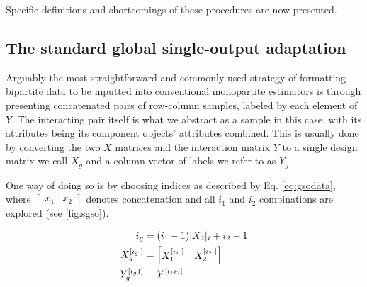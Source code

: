 Specific definitions and shortcomings of these procedures are now presented.


\subsection{The standard global single-output adaptation}
\label{sec:sgso}
Arguably the most straightforward and commonly used strategy of formatting bipartite data to be inputted into conventional monopartite estimators is through presenting concatenated pairs of row-column samples, labeled by each element of $Y$.
%
The interacting pair itself is what we abstract as a sample
in this case, with its attributes being its component objects' attributes
combined. This is usually done by converting the two $X$ matrices and the
interaction matrix $Y$ to a single design matrix we call $X_g$ and a column-vector
 of labels we refer to as $Y_g$.

One way of
doing so is by choosing indices as described by Eq. \ref{eq:gsodata}, where
$\begin{bmatrix} x_1 & x_2\end{bmatrix}$ denotes concatenation and all $i_1$ and
$i_2$ combinations are explored (see \autoref{fig:sgso}).

%
\begin{equation}
    \begin{split}
    i_g &= (i_1-1)|X_2|_i+i_2-1\\
    X_g ^{[i_g\cdot]} &= \begin{bmatrix} X_1 ^{[i_1\cdot]} & X_2^{[i_2\cdot]}\end{bmatrix}\\
    Y_g ^{[i_g1]} &= Y^{[i_1i_2]}
    \end{split}
    \label{eq:gsodata}
\end{equation}

